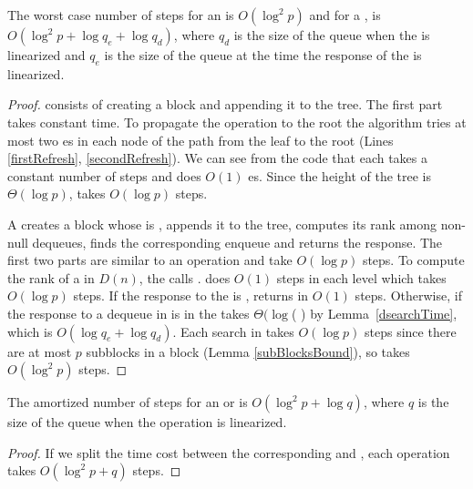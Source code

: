 \begin{lemma} \label{enqDeqTime}
The worst case number of steps for an  is $O(\log^2 p)$ and for a , is $O(\log^2 p + \log q_e+ \log q_d)$, where $q_d$ is the size of the queue when the  is linearized and $q_e$ is the size of the queue at the time the response of the  is linearized.
\end{lemma}
\begin{proof}
 consists of creating a block and appending it to the tree. The first part takes constant time. To propagate the operation to the root the algorithm tries at most two es in each node of the path from the leaf to the root (Lines \ref{firstRefresh}, \ref{secondRefresh}). We can see from the code  that each  takes a constant number of steps and does $O(1)$ es. Since the height of the tree is $\Theta(\log p)$,  takes $O(\log p)$ steps.

A  creates a block whose  is , appends it to the tree, computes its rank among non-null dequeues, finds the corresponding enqueue and returns the response. The first two parts are similar to an  operation and take $O(\log p)$ steps. To compute the rank of a  in $D(n)$, the  calls .  does $O(1)$ steps in each level which takes $O(\log p)$ steps. If the response to the  is ,  returns  in $O(1)$ steps. Otherwise, if the response to a dequeue in  is in  the  takes $\Theta(\log$( ) by Lemma~\ref{dsearchTime}, which is $O(\log q_e+\log q_d)$. Each search in  takes $O(\log p)$ steps since there are at most $p$ subblocks in a block (Lemma \ref{subBlocksBound}), so  takes $O(\log^2 p)$ steps.
\end{proof}


\begin{lemma}
The amortized number of steps for an  or  is $O(\log^2 p + \log q)$,  where $q$ is the size of the queue when the operation is linearized.
\end{lemma}
\begin{proof}
If we split the  time cost between the corresponding  and , each operation takes $O(\log^2 p +q)$ steps.
\end{proof}

